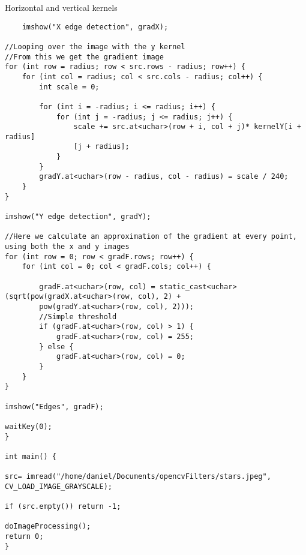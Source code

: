 \begin{listing}[H]
	\caption{Horizontal and vertical kernels}
	\label{listing:code2}
	\begin{verbatim}
    imshow("X edge detection", gradX);

//Looping over the image with the y kernel
//From this we get the gradient image
for (int row = radius; row < src.rows - radius; row++) {
	for (int col = radius; col < src.cols - radius; col++) {
		int scale = 0;
		
		for (int i = -radius; i <= radius; i++) {
			for (int j = -radius; j <= radius; j++) {
				scale += src.at<uchar>(row + i, col + j)* kernelY[i + radius]
				[j + radius];
			}
		}
		gradY.at<uchar>(row - radius, col - radius) = scale / 240;
	}
}

imshow("Y edge detection", gradY);

//Here we calculate an approximation of the gradient at every point, using both the x and y images
for (int row = 0; row < gradF.rows; row++) {
	for (int col = 0; col < gradF.cols; col++) {
		
		gradF.at<uchar>(row, col) = static_cast<uchar>(sqrt(pow(gradX.at<uchar>(row, col), 2) + 
		pow(gradY.at<uchar>(row, col), 2)));
		//Simple threshold
		if (gradF.at<uchar>(row, col) > 1) {
			gradF.at<uchar>(row, col) = 255;
		} else {
			gradF.at<uchar>(row, col) = 0;
		}
	}
}

imshow("Edges", gradF);

waitKey(0);
}

int main() {

src= imread("/home/daniel/Documents/opencvFilters/stars.jpeg", CV_LOAD_IMAGE_GRAYSCALE);

if (src.empty()) return -1;

doImageProcessing();
return 0;
}
\end{verbatim}
\end{listing}